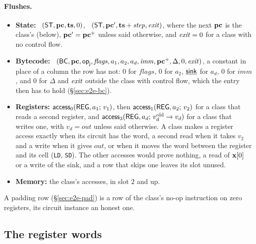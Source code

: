 \paragraph{Flushes.}
\begin{itemize}
  \item \textbf{State:} \pull\ $( \mathsf{ST},\mathbf{pc},\mathbf{ts},0 )$, \push\ $( \mathsf{ST},\mathbf{pc}',\mathbf{ts}+\mathit{step},\mathit{exit} )$, where the next $\mathbf{pc}$ is the class's (below), $\mathbf{pc}'=\mathbf{pc}^{+}$ unless said otherwise, and $\mathit{exit}=0$ for a class with no control flow.
  \item \textbf{Bytecode:} \pull\ $( \mathsf{BC},\mathbf{pc},\mathsf{op}_{\mathsf{j}},\mathit{flags},a_1,a_2,a_d,\mathit{imm},\mathbf{pc}^{+},\Delta,0,\mathit{exit} )$, a constant in place of a column the row has not: $0$ for $\mathit{flags}$, $0$ for $a_2$, $\underline{\mathsf{sink}}$ for $a_d$, $0$ for $\mathit{imm}$, and $0$ for $\Delta$ and $\mathit{exit}$ outside the class with control flow, which the entry then has to hold (\S\ref{sec:e2e-bc}).
  \item \textbf{Registers:} $\mathsf{access}_{0}( \mathsf{REG},a_1;\,v_1 )$, then $\mathsf{access}_{1}( \mathsf{REG},a_2;\,v_2 )$ for a class that reads a second register, and $\mathsf{access}_{3}( \mathsf{REG},a_d;\,v_d^{\mathrm{old}}\to v_d )$ for a class that writes one, with $v_d=\mathit{out}$ unless said otherwise. A class makes a register access exactly when its circuit has the word, a second read when it takes $v_2$ and a write when it gives $\mathit{out}$, or when it moves the word between the register and its cell (\texttt{LD}, \texttt{SD}). The other accesses would prove nothing, a read of $\mathbf{x}[0]$ or a write of the sink, and a row that skips one leaves its slot unused.
  \item \textbf{Memory:} the class's accesses, in slot $2$ and up.
\end{itemize}
A padding row (\S\ref{sec:e2e-pad}) is a row of the class's no-op instruction on zero registers, its circuit instance an honest one.

\subsection{The register words}\label{sec:regpack}

